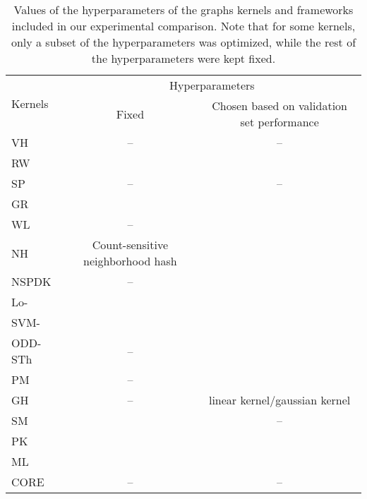 \documentclass[twoside,11pt]{article}
\begin{document}
\begin{table}[t]
\centering
\scriptsize
\begin{sc}
\def\arraystretch{1.2}
\begin{tabular}{|l|c|c|} \hline
\multirow{2}{*}{Kernels} & \multicolumn{2}{c|}{Hyperparameters} \\ \cline{2-3} 
                         & Fixed          & Chosen based on validation set performance          \\ \hline
VH                       &   --                & --                 \\ \hline
RW                      &                 &                 \\ \hline
SP                       &--                   &--                  \\ \hline
GR                       &                   &                  \\ \hline
WL                       &  --                 &                  \\ \hline
NH                       &Count-sensitive neighborhood hash             &                  \\ \hline
NSPDK                    &--                   &                 \\ \hline
Lo-      &                &               \\ \hline
SVM-  &  &                  \\ \hline
ODD-STh                  &--                   &                 \\ \hline
PM                       &--                   &                  \\ \hline
GH                       &--                   &linear kernel/gaussian kernel                 \\ \hline
SM                       &                   &    --              \\ \hline
PK                      &                   &                 \\ \hline
ML                       &                &                  \\ \hline
CORE                     &  --                 & --                \\ \hline
\end{tabular}
\end{sc}
\caption{Values of the hyperparameters of the graphs kernels and frameworks included in our experimental comparison. Note that for some kernels, only a subset of the hyperparameters was optimized, while the rest of the hyperparameters were kept fixed.}
\label{tab:kernel_parametrization}
\end{table}
\end{document}
